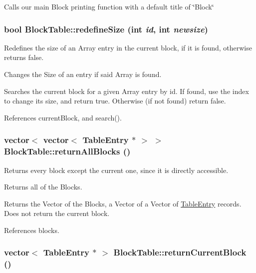 Calls our main Block printing function with a default title of \char`\"{}Block\char`\"{} \hypertarget{classBlockTable_a0475d9253127e652e48a24ff3c09b38c}{
\subsubsection[{redefineSize}]{\setlength{\rightskip}{0pt plus 5cm}bool BlockTable::redefineSize (int {\em id}, \/  int {\em newsize})}}
\label{classBlockTable_a0475d9253127e652e48a24ff3c09b38c}


Redefines the size of an Array entry in the current block, if it is found, otherwise returns false. 

Changes the Size of an entry if said Array is found.

Searches the current block for a given Array entry by id. If found, use the index to change its size, and return true. Otherwise (if not found) return false. 

References currentBlock, and search().

\hypertarget{classBlockTable_a0693b9fbb429eb427818b922796f0b4f}{
\subsubsection[{returnAllBlocks}]{\setlength{\rightskip}{0pt plus 5cm}vector$<$ vector$<$ {\bf TableEntry} $\ast$ $>$ $>$ BlockTable::returnAllBlocks ()}}
\label{classBlockTable_a0693b9fbb429eb427818b922796f0b4f}


Returns every block except the current one, since it is directly accessible. 

Returns all of the Blocks.

Returns the Vector of the Blocks, a Vector of a Vector of \hyperlink{structTableEntry}{TableEntry} records. Does not return the current block. 

References blocks.

\hypertarget{classBlockTable_a2d731b3b9e3313c65eb8d065d3ee9a0e}{
\subsubsection[{returnCurrentBlock}]{\setlength{\rightskip}{0pt plus 5cm}vector$<$ {\bf TableEntry} $\ast$ $>$ BlockTable::returnCurrentBlock ()}}
\label{classBlockTable_a2d731b3b9e3313c65eb8d065d3ee9a0e}


